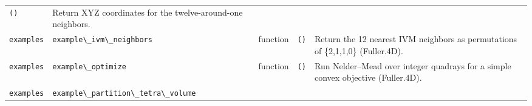 \documentclass[
  10pt,
]{article}
\newcommand{\passthrough}[1]{#1}
\begin{document}
\begin{longtable}[]{@{}lllll@{}}
\begin{minipage}[t]{0.17\columnwidth}
\passthrough{\lstinline!()!}\strut
\end{minipage} & \begin{minipage}[t]{0.17\columnwidth}\raggedright
Return XYZ coordinates for the twelve-around-one neighbors.\strut
\end{minipage}\tabularnewline
\begin{minipage}[t]{0.17\columnwidth}\raggedright
\passthrough{\lstinline!examples!}\strut
\end{minipage} & \begin{minipage}[t]{0.17\columnwidth}\raggedright
\passthrough{\lstinline!example\_ivm\_neighbors!}\strut
\end{minipage} & \begin{minipage}[t]{0.17\columnwidth}\raggedright
function\strut
\end{minipage} & \begin{minipage}[t]{0.17\columnwidth}\raggedright
\passthrough{\lstinline!()!}\strut
\end{minipage} & \begin{minipage}[t]{0.17\columnwidth}\raggedright
Return the 12 nearest IVM neighbors as permutations of \{2,1,1,0\}
(Fuller.4D).\strut
\end{minipage}\tabularnewline
\begin{minipage}[t]{0.17\columnwidth}\raggedright
\passthrough{\lstinline!examples!}\strut
\end{minipage} & \begin{minipage}[t]{0.17\columnwidth}\raggedright
\passthrough{\lstinline!example\_optimize!}\strut
\end{minipage} & \begin{minipage}[t]{0.17\columnwidth}\raggedright
function\strut
\end{minipage} & \begin{minipage}[t]{0.17\columnwidth}\raggedright
\passthrough{\lstinline!()!}\strut
\end{minipage} & \begin{minipage}[t]{0.17\columnwidth}\raggedright
Run Nelder--Mead over integer quadrays for a simple convex objective
(Fuller.4D).\strut
\end{minipage}\tabularnewline
\begin{minipage}[t]{0.17\columnwidth}\raggedright
\passthrough{\lstinline!examples!}\strut
\end{minipage} & \begin{minipage}[t]{0.17\columnwidth}\raggedright
\passthrough{\lstinline!example\_partition\_tetra\_volume!}\strut

\end{minipage}
\end{longtable}
\end{document}
